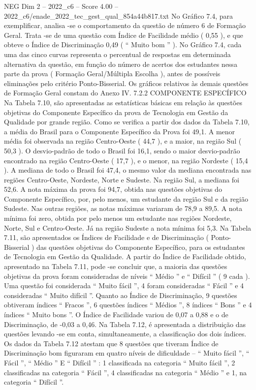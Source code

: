 \begin{textsample}{NEG Dim 2 – 2022\_c6 – Score 4.00 – 2022\_c6/enade\_2022\_tec\_gest\_qual\_854a44b817.txt}
No Gráfico 7.4, para exemplificar, analisa -se o comportamento da questão de número 6 de Formação Geral.
Trata -se de uma questão com Índice de Facilidade médio ( 0,55 ), e que obteve o Índice de Discriminação 0,49 ( “ Muito bom ” ).
No Gráfico 7.4, cada uma das cinco curvas representa o percentual de respostas em determinada alternativa da questão, em função do número de acertos dos estudantes nessa parte da prova ( Formação Geral/Múltipla Escolha ), antes de possíveis eliminações pelo critério Ponto-Bisserial.
Os gráficos relativos às demais questões de Formação Geral constam do Anexo IV. 7.2.2 COMPONENTE ESPECÍFICO Na Tabela 7.10, são apresentadas as estatísticas básicas em relação às questões objetivas do Componente Específico da prova de Tecnologia em Gestão da Qualidade por grande região.
Como se verifica a partir dos dados da Tabela 7.10, a média do Brasil para o Componente Específico da Prova foi 49,1.
A menor média foi observada na região Centro-Oeste ( 44,7 ), e a maior, na região Sul ( 50,3 ).
O desvio-padrão de todo o Brasil foi 16,1, sendo o maior desvio-padrão encontrado na região Centro-Oeste ( 17,7 ), e o menor, na região Nordeste ( 15,4 ).
A mediana de todo o Brasil foi 47,4, o mesmo valor da mediana encontrada nas regiões Centro-Oeste, Nordeste, Norte e Sudeste.
Na região Sul, a mediana foi 52,6.
A nota máxima da prova foi 94,7, obtida nas questões objetivas do Componente Específico, por, pelo menos, um estudante da região Sul e da região Sudeste.
Nas outras regiões, as notas máximas variaram de 78,9 a 89,5.
A nota mínima foi zero, obtida por pelo menos um estudante nas regiões Nordeste, Norte, Sul e Centro-Oeste.
Já na região Sudeste a nota mínima foi 5,3.
Na Tabela 7.11, são apresentados os Índices de Facilidade e de Discriminação ( Ponto-Bisserial ) das questões objetivas do Componente Específico, para os estudantes de Tecnologia em Gestão da Qualidade.
A partir do Índice de Facilidade obtido, apresentado na Tabela 7.11, pode -se concluir que, a maioria das questões objetivas da prova foram consideradas de níveis “ Médio ” e “ Difícil ” ( 9 cada ).
Uma questão foi considerada “ Muito fácil ”, 4 foram consideradas “ Fácil ” e 4 consideradas “ Muito difícil ”.
Quanto ao Índice de Discriminação, 9 questões obtiveram índices “ Fracos ”, 6 questões índices “ Médios ”, 8 índices “ Bons ” e 4 índices “ Muito bons ”.
O Índice de Facilidade variou de 0,07 a 0,88 e o de Discriminação, de -0,03 a 0,46.
Na Tabela 7.12, é apresentada a distribuição das questões levando -se em conta, simultaneamente, a classificação dos dois índices.
Os dados da Tabela 7.12 atestam que 8 questões que tiveram Índice de Discriminação bom figuraram em quatro níveis de dificuldade – “ Muito fácil ”, “ Fácil ”, “ Médio ” E “ Difícil ” : 1 classificada na categoria “ Muito fácil ”, 2 classificadas na categoria “ Fácil ”, 4 classificadas na categoria “ Médio ” e 1, na categoria “ Difícil ”.

\end{textsample}
